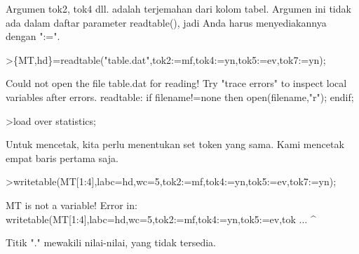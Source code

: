 \documentclass[a4paper,10pt]{article}
\begin{document}
\begin{eulernotebook}
\begin{eulercomment}
\begin{eulercomment}
\begin{eulercomment}
\begin{eulercomment}
\begin{eulercomment}
\begin{eulercomment}
\begin{eulercomment}
\begin{eulercomment}
\begin{eulercomment}
\begin{eulercomment}
\begin{eulercomment}
\begin{eulercomment}
\begin{eulercomment}
\begin{eulercomment}
\begin{eulercomment}
\begin{eulercomment}
\begin{eulercomment}
\begin{eulercomment}
\begin{eulercomment}
Argumen tok2, tok4 dll. adalah terjemahan dari kolom tabel. Argumen
ini tidak ada dalam daftar parameter readtable(), jadi Anda harus
menyediakannya dengan ":=".
\end{eulercomment}
\begin{eulerprompt}
>\{MT,hd\}=readtable("table.dat",tok2:=mf,tok4:=yn,tok5:=ev,tok7:=yn);
\end{eulerprompt}
\begin{euleroutput}
  Could not open the file
  table.dat
  for reading!
  Try "trace errors" to inspect local variables after errors.
  readtable:
      if filename!=none then open(filename,"r"); endif;
\end{euleroutput}
\begin{eulerprompt}
>load over statistics;
\end{eulerprompt}
\begin{eulercomment}
Untuk mencetak, kita perlu menentukan set token yang sama. Kami
mencetak empat baris pertama saja.
\end{eulercomment}
\begin{eulerprompt}
>writetable(MT[1:4],labc=hd,wc=5,tok2:=mf,tok4:=yn,tok5:=ev,tok7:=yn);
\end{eulerprompt}
\begin{euleroutput}
  MT is not a variable!
  Error in:
  writetable(MT[1:4],labc=hd,wc=5,tok2:=mf,tok4:=yn,tok5:=ev,tok ...
                    ^
\end{euleroutput}
\begin{eulercomment}
Titik "." mewakili nilai-nilai, yang tidak tersedia.


\end{eulercomment}
\end{eulercomment}
\end{eulercomment}
\end{eulercomment}
\end{eulercomment}
\end{eulercomment}
\end{eulercomment}
\end{eulercomment}
\end{eulercomment}
\end{eulercomment}
\end{eulercomment}
\end{eulercomment}
\end{eulercomment}
\end{eulercomment}
\end{eulercomment}
\end{eulercomment}
\end{eulercomment}
\end{eulercomment}
\end{eulercomment}
\end{eulernotebook}
\end{document}
